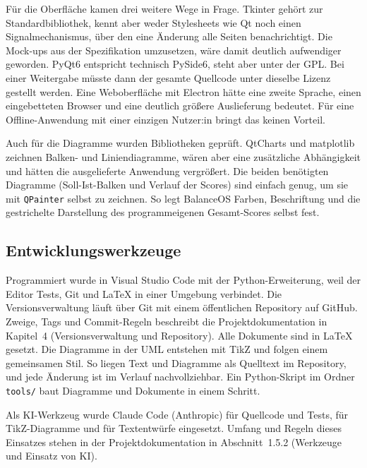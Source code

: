 Für die Oberfläche kamen drei weitere Wege in Frage. Tkinter gehört zur Standardbibliothek, kennt aber weder Stylesheets wie Qt noch einen Signalmechanismus, über den eine Änderung alle Seiten benachrichtigt. Die Mock-ups aus der Spezifikation umzusetzen, wäre damit deutlich aufwendiger geworden. PyQt6 entspricht technisch PySide6, steht aber unter der GPL. Bei einer Weitergabe müsste dann der gesamte Quellcode unter dieselbe Lizenz gestellt werden. Eine Weboberfläche mit Electron hätte eine zweite Sprache, einen eingebetteten Browser und eine deutlich größere Auslieferung bedeutet. Für eine Offline-Anwendung mit einer einzigen Nutzer:in bringt das keinen Vorteil.

Auch für die Diagramme wurden Bibliotheken geprüft. QtCharts und matplotlib zeichnen Balken- und Liniendiagramme, wären aber eine zusätzliche Abhängigkeit und hätten die ausgelieferte Anwendung vergrößert. Die beiden benötigten Diagramme (Soll-Ist-Balken und Verlauf der Scores) sind einfach genug, um sie mit \texttt{QPainter} selbst zu zeichnen. So legt BalanceOS Farben, Beschriftung und die gestrichelte Darstellung des programmeigenen Gesamt-Scores selbst fest.

\subsection{Entwicklungswerkzeuge}
Programmiert wurde in Visual Studio Code mit der Python-Erweiterung, weil der Editor Tests, Git und LaTeX in einer Umgebung verbindet. Die Versionsverwaltung läuft über Git mit einem öffentlichen Repository auf GitHub. Zweige, Tags und Commit-Regeln beschreibt die Projektdokumentation in Kapitel~4 (Versionsverwaltung und Repository). Alle Dokumente sind in \LaTeX{} gesetzt. Die Diagramme in der \ac{UML} entstehen mit TikZ und folgen einem gemeinsamen Stil. So liegen Text und Diagramme als Quelltext im Repository, und jede Änderung ist im Verlauf nachvollziehbar. Ein Python-Skript im Ordner \texttt{tools/} baut Diagramme und Dokumente in einem Schritt.

Als KI-Werkzeug wurde Claude Code (Anthropic) für Quellcode und Tests, für TikZ-Diagramme und für Textentwürfe eingesetzt. Umfang und Regeln dieses Einsatzes stehen in der Projektdokumentation in Abschnitt~1.5.2 (Werkzeuge und Einsatz von KI).
